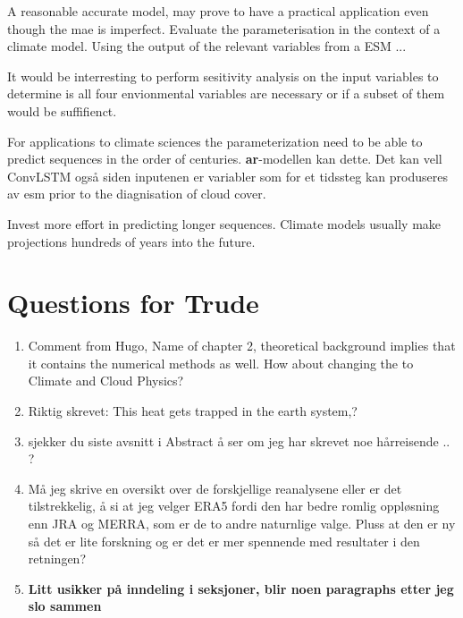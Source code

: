 A reasonable accurate model, may prove to have a practical application even though the \acrshort{mae} is imperfect. Evaluate the parameterisation in the context of a climate model. Using the output of the relevant variables from a \acrshort{ESM} ... 

It would be interresting to perform sesitivity analysis on the input variables to determine is all four envionmental variables are necessary or if a subset of them would be suffifienct. 

For applications to climate sciences the parameterization need to be able to predict sequences in the order of centuries. \textbf{ar}-modellen kan dette. Det kan vell ConvLSTM også siden inputenen er variabler som for et tidssteg kan produseres av \acrshort{esm} prior to the diagnisation of cloud cover. 

Invest more effort in predicting longer sequences. Climate models usually make projections hundreds of years into the future.





\section{Questions for Trude}

\begin{enumerate}
    \item Comment from Hugo, Name of chapter 2, theoretical background implies that it contains the numerical methods as well. How about changing the to Climate and Cloud Physics?
    \item Riktig skrevet: This heat gets trapped in the earth system,?
    \item sjekker du siste avsnitt i Abstract å ser om jeg har skrevet noe hårreisende .. ?
    \item Må jeg skrive en oversikt over de forskjellige reanalysene eller er det tilstrekkelig, å si at jeg velger ERA5 fordi den har bedre romlig oppløsning enn JRA og MERRA, som er de to andre naturnlige valge. Pluss at den er ny så det er lite forskning og er det er mer spennende med resultater i den retningen?
    \item \textbf{Litt usikker på inndeling i seksjoner, blir noen paragraphs etter jeg slo sammen }
\end{enumerate}